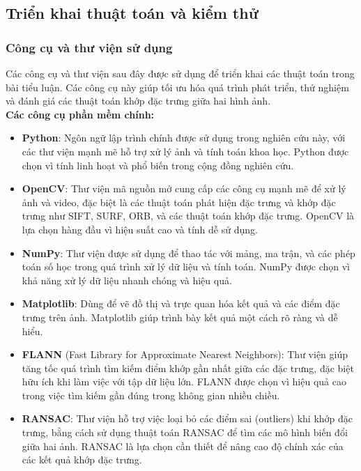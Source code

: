 \subsection{Triển khai thuật toán và kiểm thử}
\subsubsection{Công cụ và thư viện sử dụng}
Các công cụ và thư viện sau đây được sử dụng để triển khai các thuật toán trong bài tiểu luận. Các công cụ này giúp tối ưu hóa quá trình phát triển, thử nghiệm và đánh giá các thuật toán khớp đặc trưng giữa hai hình ảnh.\\

\textbf{Các công cụ phần mềm chính:}

\begin{itemize}
	\item \textbf{Python}: Ngôn ngữ lập trình chính được sử dụng trong nghiên cứu này, với các thư viện mạnh mẽ hỗ trợ xử lý ảnh và tính toán khoa học. Python được chọn vì tính linh hoạt và phổ biến trong cộng đồng nghiên cứu.
	\item \textbf{OpenCV}: Thư viện mã nguồn mở cung cấp các công cụ mạnh mẽ để xử lý ảnh và video, đặc biệt là các thuật toán phát hiện đặc trưng và khớp đặc trưng như SIFT, SURF, ORB, và các thuật toán khớp đặc trưng. OpenCV là lựa chọn hàng đầu vì hiệu suất cao và tính dễ sử dụng.
	\item \textbf{NumPy}: Thư viện được sử dụng để thao tác với mảng, ma trận, và các phép toán số học trong quá trình xử lý dữ liệu và tính toán. NumPy được chọn vì khả năng xử lý dữ liệu nhanh chóng và hiệu quả.
	\item \textbf{Matplotlib}: Dùng để vẽ đồ thị và trực quan hóa kết quả và các điểm đặc trưng trên ảnh. Matplotlib giúp trình bày kết quả một cách rõ ràng và dễ hiểu.
	\item \textbf{FLANN} (Fast Library for Approximate Nearest Neighbors): Thư viện giúp tăng tốc quá trình tìm kiếm điểm khớp gần nhất giữa các đặc trưng, đặc biệt hữu ích khi làm việc với tập dữ liệu lớn. FLANN được chọn vì hiệu quả cao trong việc tìm kiếm gần đúng trong không gian nhiều chiều.
	\item \textbf{RANSAC}: Thư viện hỗ trợ việc loại bỏ các điểm sai (outliers) khi khớp đặc trưng, bằng cách sử dụng thuật toán RANSAC để tìm các mô hình biến đổi giữa hai ảnh. RANSAC là lựa chọn cần thiết để nâng cao độ chính xác của các kết quả khớp đặc trưng.
\end{itemize}

